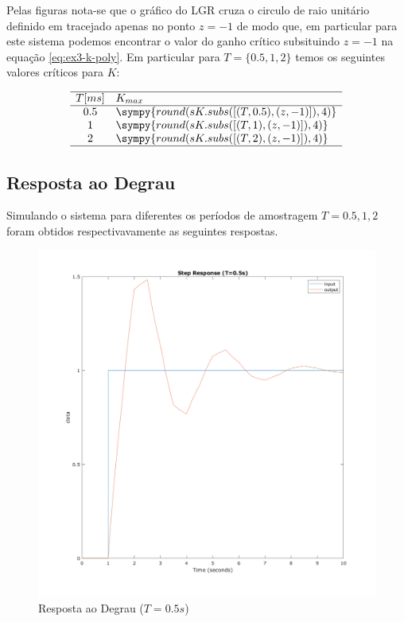 \documentclass[a4paper,11pt]{article}
\newcommand{\npy}[1]{\sympy{round(#1,4)}}
\begin{document}
Pelas figuras nota-se que o gráfico do LGR cruza o circulo de raio unitário definido em tracejado apenas no ponto $z=-1$ de modo que, em particular para este sistema podemos encontrar o valor do ganho crítico subsituindo $z=-1$ na equação \ref{eq:ex3-k-poly}. Em particular para $T=\{0.5,1,2\}$ temos os seguintes valores críticos para $K$:

\begin{table}[H]
    \centering
    $$
    \begin{array}{cl}
        \hline
        T [ms] & K_{max} \\
        \hline
        0.5 & \npy{sK.subs([(T,0.5),(z,-1)])}\\
        1 & \npy{sK.subs([(T,1),(z,-1)])}\\
        2 & \npy{sK.subs([(T,2),(z,-1)])}\\
        \hline
    \end{array}
    $$
\end{table}

\subsection{Resposta ao Degrau} 

Simulando o sistema para diferentes os períodos de amostragem $T={0.5,1,2}$ foram obtidos respectivavamente as seguintes respostas.

\begin{figure}[H]
    \centering
    \includegraphics[width=0.8\linewidth]{img/exsim3-step-t500ms.png}
    \caption{ Resposta ao Degrau ($T=0.5s$)}
\end{figure}
\end{document}
